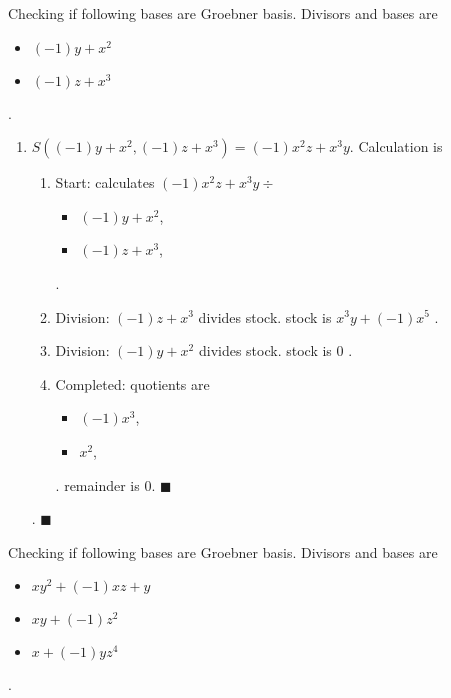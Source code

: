 \documentclass{jsarticle}
\begin{document}
Checking if following bases are Groebner basis.  
Divisors and bases are 
\begin{itemize}
\item $(-1)y+x^{2}$\item $(-1)z+x^{3}$\end{itemize} .  
\begin{enumerate}
\item $S((-1)y+x^{2}, (-1)z+x^{3}) = (-1)x^{2}z+x^{3}y$.  Calculation is \begin{enumerate}
\item Start: calculates $(-1)x^{2}z+x^{3}y\div $\begin{itemize}
\item $(-1)y+x^{2}$, 
\item $(-1)z+x^{3}$, 
\end{itemize} .  

\item Division: $(-1)z+x^{3}$ divides stock. stock is $x^{3}y+(-1)x^{5}$ .  
\item Division: $(-1)y+x^{2}$ divides stock. stock is $0$ .  
\item Completed: quotients are \begin{itemize}
\item $(-1)x^{3}$, 
\item $x^{2}$, 
\end{itemize} .  
remainder is $0$.  $\blacksquare$
\end{enumerate}
.  $\blacksquare{}$\end{enumerate}
Checking if following bases are Groebner basis.  
Divisors and bases are 
\begin{itemize}
\item $xy^{2}+(-1)xz+y$\item $xy+(-1)z^{2}$\item $x+(-1)yz^{4}$\end{itemize} .  
\end{document}
